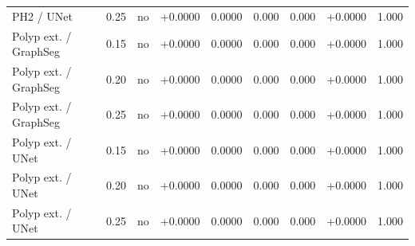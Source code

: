 \begin{table}[t]
\begin{tabular}{lllllllll}
PH2 / UNet & 0.25 & no & +0.0000 & 0.0000 & 0.000 & 0.000 & +0.0000 & 1.000 \\
Polyp ext. / GraphSeg & 0.15 & no & +0.0000 & 0.0000 & 0.000 & 0.000 & +0.0000 & 1.000 \\
Polyp ext. / GraphSeg & 0.20 & no & +0.0000 & 0.0000 & 0.000 & 0.000 & +0.0000 & 1.000 \\
Polyp ext. / GraphSeg & 0.25 & no & +0.0000 & 0.0000 & 0.000 & 0.000 & +0.0000 & 1.000 \\
Polyp ext. / UNet & 0.15 & no & +0.0000 & 0.0000 & 0.000 & 0.000 & +0.0000 & 1.000 \\
Polyp ext. / UNet & 0.20 & no & +0.0000 & 0.0000 & 0.000 & 0.000 & +0.0000 & 1.000 \\
Polyp ext. / UNet & 0.25 & no & +0.0000 & 0.0000 & 0.000 & 0.000 & +0.0000 & 1.000 \\
\bottomrule
\end{tabular}
\end{table}
